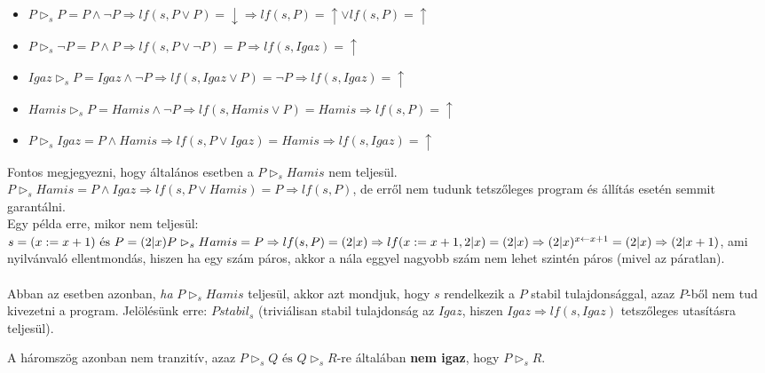 \documentclass[12pt]{article}
\begin{document}
	
	\begin{itemize}
		\item $P \vartriangleright_s P = P \land \neg P \Rightarrow lf(s,P \lor P) = \downarrow \Rightarrow lf(s,P) = \uparrow \lor lf(s,P) = \uparrow$
		\item $P \vartriangleright_s \neg P = P \land P \Rightarrow lf(s,P \lor \neg P) = P \Rightarrow lf(s,Igaz) = \uparrow$
		\item $Igaz \vartriangleright_s P = Igaz \land \neg P \Rightarrow lf(s,Igaz \lor P) = \neg P \Rightarrow lf(s,Igaz) = \uparrow$
		\item $Hamis \vartriangleright_s P = Hamis \land \neg P \Rightarrow lf(s, Hamis \lor P) = Hamis \Rightarrow lf(s,P) = \uparrow$
		\item $P \vartriangleright_s Igaz = P \land Hamis \Rightarrow lf(s,P \lor Igaz) = Hamis \Rightarrow lf(s,Igaz) = \uparrow$
		
	\end{itemize}
	Fontos megjegyezni, hogy általános esetben a $P \vartriangleright_s Hamis$ nem teljesül.\\
	$P \vartriangleright_s Hamis = P \land Igaz \Rightarrow lf(s,P \lor Hamis) = P \Rightarrow lf(s,P)$, de erről nem tudunk tetszőleges program és állítás esetén semmit garantálni.\\
	Egy példa erre, mikor nem teljesül:\\
	$s = (x := x+1) \text{ és } P = (2|x) \\
	P \vartriangleright_s Hamis = P \Rightarrow lf(s,P) = (2|x) \Rightarrow lf(x:=x+1, 2|x) = (2|x) \Rightarrow (2|x)^{x \leftarrow x+1} = (2|x) \Rightarrow (2|x+1) $, ami nyilvánvaló ellentmondás, hiszen ha egy szám páros, akkor a nála eggyel nagyobb szám nem lehet szintén páros (mivel az páratlan).
	\paragraph{}Abban az esetben azonban, \textit{ha} $P \vartriangleright_s Hamis$ teljesül, akkor azt mondjuk, hogy $s$ rendelkezik a $P$ stabil tulajdonsággal, azaz $P$-ből nem tud kivezetni a program. Jelölésünk erre: $P stabil_s$ (triviálisan stabil tulajdonság az $Igaz$, hiszen $Igaz \Rightarrow lf(s,Igaz)$ tetszőleges utasításra teljesül).
	
	A háromszög azonban nem tranzitív, azaz $ P \vartriangleright_s Q \text{ és } Q \vartriangleright_s R$-re általában \textbf{nem igaz}, hogy $P \vartriangleright_s R$.
	
	
\end{document}
